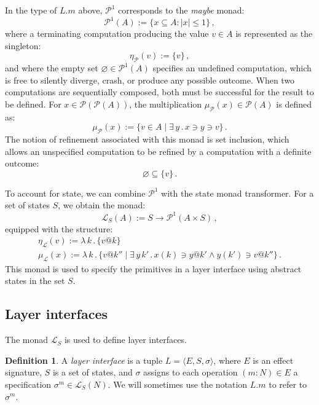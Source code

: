 \documentclass[draft,11pt]{report}
\theoremstyle{definition}
\newtheorem{definition}[theorem]{Definition}
\begin{document}
In the type of $L.m$ above,
$\mathcal{P}^1$ corresponds to the \emph{maybe} monad:
\[
  \mathcal{P}^1(A) := \{ x \subseteq A : |x| \le 1 \} \,,
\]
where a terminating computation producing
the value $v \in A$ is represented as the singleton:
\[
  \eta_\mathcal{P}(v) := \{ v \} \,,
\]
and where the empty set $\varnothing \in \mathcal{P}^1(A)$
specifies an undefined computation,
which is free to silently diverge, crash, or
produce any possible outcome.
When two computations are sequentially composed,
both must be successful for the result to be defined.
For $x \in \mathcal{P}(\mathcal{P}(A))$,
the multiplication $\mu_\mathcal{P}(x) \in \mathcal{P}(A)$
is defined as:
\[
  \mu_\mathcal{P}(x) :=
    \{ v \in A \mid \exists \, y \,.\, x \ni y \ni v \} \,.
\]
The notion of refinement associated with this monad is set inclusion,
which allows an unspecified computation to be refined by
a computation with a definite outcome:
\[
  \varnothing \subseteq \{ v \} \,.
\]

To account for state,
we can combine $\mathcal{P}^1$ with the state monad transformer.
For a set of states $S$,
we obtain the monad:
\[
  \mathcal{L}_S(A) :=
    S \rightarrow \mathcal{P}^1({A} \times S) \,,
\]
equipped with the structure:
\begin{gather*}
  \eta_\mathcal{L}(v) :=
    \lambda \, k \,.\, \{ v@k \} \\
  \mu_\mathcal{L}(x) :=
    \lambda \, k \,.\, \{ v@k'' \mid
      \exists \, y \, k' \,.\, x(k) \ni y@k' \wedge y(k') \ni v@k'' \}
  \,.
\end{gather*}
This monad is used to specify the primitives
in a layer interface using abstract states in the set $S$.


\subsection{Layer interfaces} %

The monad $\mathcal{L}_S$ is used to define
layer interfaces.

\begin{definition} %
A \emph{layer interface} is a tuple
$L = \langle E, S, \sigma \rangle$,
where $E$ is an effect signature,
$S$ is a set of states,
and $\sigma$ assigns to each operation
$(m : N) \in E$
a specification
$\sigma^m \in \mathcal{L}_S(N)$.
We will sometimes use the notation $L.m$
to refer to $\sigma^m$.
\end{definition}
\end{document}
